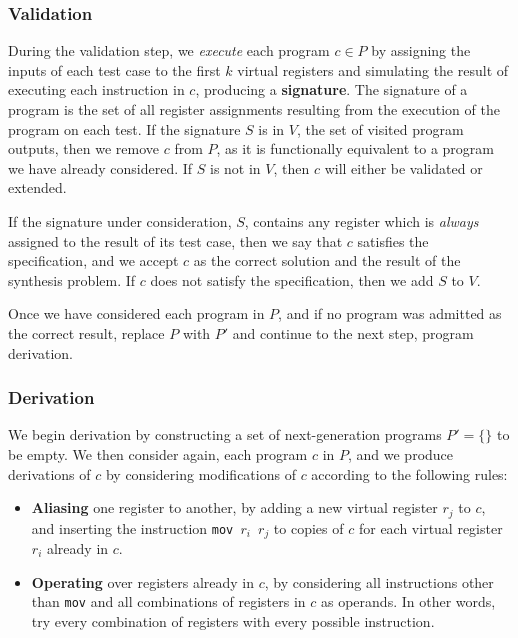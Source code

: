 \documentclass{article}
\begin{document}
\subsubsection{Validation}

During the validation step, we \textit{execute} each program $c \in P$ by
assigning the inputs of each test case to the first $k$ virtual registers and
simulating the result of executing each instruction in $c$, producing a
\textbf{signature}.  The signature of a program is the set of all register
assignments resulting from the execution of the program on each test.  If the
signature $S$ is in $V$, the set of visited program outputs, then we remove $c$
from $P$, as it is functionally equivalent to a program we have already
considered.  If $S$ is not in $V$, then $c$ will either be validated or
extended.

If the signature under consideration, $S$, contains any register which is
\textit{always} assigned to the result of its test case, then we say that $c$
satisfies the specification, and we accept $c$ as the correct solution and the
result of the synthesis problem.  If $c$ does not satisfy the specification,
then we add $S$ to $V$.

Once we have considered each program in $P$, and if no program was admitted as
the correct result, replace $P$ with $P'$ and continue to the next step,
program derivation.

\subsubsection{Derivation}

We begin derivation by constructing a set of next-generation programs $P' =
\{\}$ to be empty.  We then consider again, each program $c$ in $P$, and we
produce derivations of $c$ by considering modifications of $c$ according to the
following rules:

\begin{itemize}
    \item \textbf{Aliasing} one register to another, by adding a new virtual
	register $r_{j}$ to $c$, and inserting the instruction \texttt{mov
	$r_{i}$ $r_{j}$} to copies of $c$ for each virtual register $r_{i}$
	already in $c$.
    \item \textbf{Operating} over registers already in $c$, by considering all
	instructions other than \texttt{mov} and all combinations of registers
	in $c$ as operands. In other words, try every combination of registers
	with every possible instruction.
\end{itemize}
\end{document}
